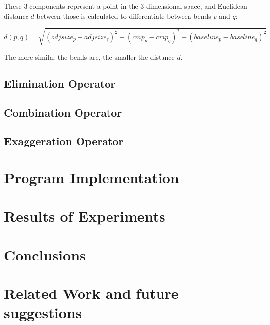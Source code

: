 \documentclass[a4paper]{article}
\begin{document}
These 3 components represent a point in the 3-dimensional space, and Euclidean
distance $d$ between those is calculated to differentiate between bends $p$ and
$q$:

\[
    d(p,q) = \sqrt{(adjsize_p-adjsize_q)^2 +
                   (cmp_p-cmp_q)^2 +
                   (baseline_p-baseline_q)^2}
\]

The more similar the bends are, the smaller the distance $d$.

\subsection{Elimination Operator}

\subsection{Combination Operator}

\subsection{Exaggeration Operator}

\section{Program Implementation}

\section{Results of Experiments}

\section{Conclusions}
\label{sec:conclusions}

\section{Related Work and future suggestions}
\label{sec:related_work}

\printbibliography
\end{document}

